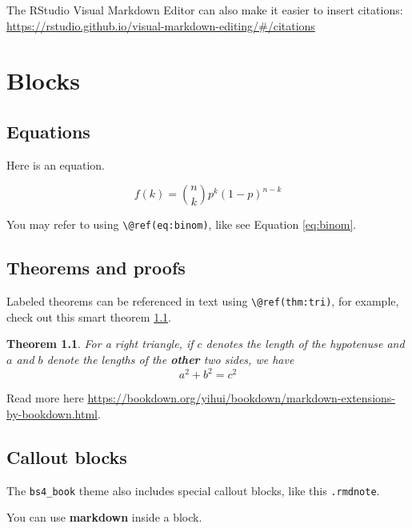 \documentclass[
]{book}
\newtheorem{theorem}{Theorem}[chapter]
\theoremstyle{definition}
\theoremstyle{definition}
\theoremstyle{definition}
\theoremstyle{definition}
\theoremstyle{remark}
\begin{document}
The RStudio Visual Markdown Editor can also make it easier to insert citations: \url{https://rstudio.github.io/visual-markdown-editing/\#/citations}

\hypertarget{blocks}{%
\chapter{Blocks}\label{blocks}}

\hypertarget{equations}{%
\section{Equations}\label{equations}}

Here is an equation.

\begin{equation} 
  f\left(k\right) = \binom{n}{k} p^k\left(1-p\right)^{n-k}
  \label{eq:binom}
\end{equation}

You may refer to using \texttt{\textbackslash{}@ref(eq:binom)}, like see Equation \eqref{eq:binom}.

\hypertarget{theorems-and-proofs}{%
\section{Theorems and proofs}\label{theorems-and-proofs}}

Labeled theorems can be referenced in text using \texttt{\textbackslash{}@ref(thm:tri)}, for example, check out this smart theorem \ref{thm:tri}.

\begin{theorem}
\protect\hypertarget{thm:tri}{}\label{thm:tri}For a right triangle, if \(c\) denotes the \emph{length} of the hypotenuse
and \(a\) and \(b\) denote the lengths of the \textbf{other} two sides, we have
\[a^2 + b^2 = c^2\]
\end{theorem}

Read more here \url{https://bookdown.org/yihui/bookdown/markdown-extensions-by-bookdown.html}.

\hypertarget{callout-blocks}{%
\section{Callout blocks}\label{callout-blocks}}

The \texttt{bs4\_book} theme also includes special callout blocks, like this \texttt{.rmdnote}.

You can use \textbf{markdown} inside a block.
\end{document}
